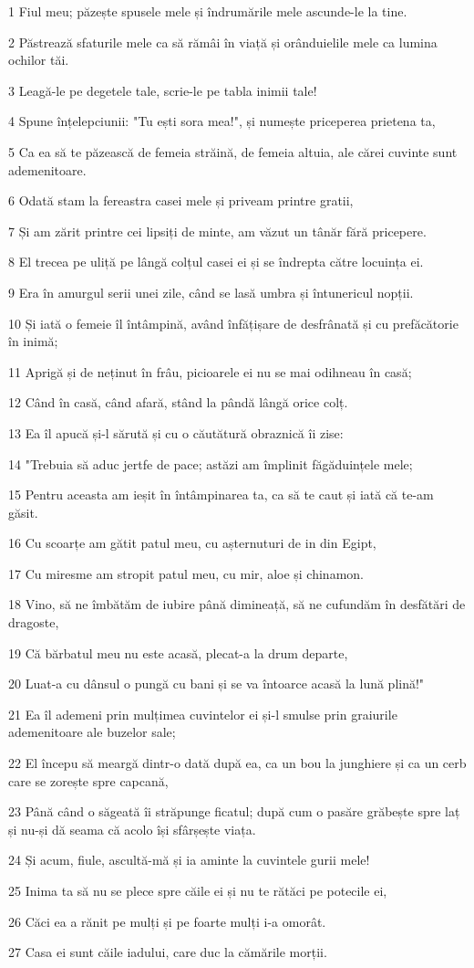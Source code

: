 \par 1 Fiul meu; păzește spusele mele și îndrumările mele ascunde-le la tine.
\par 2 Păstrează sfaturile mele ca să rămâi în viață și orânduielile mele ca lumina ochilor tăi.
\par 3 Leagă-le pe degetele tale, scrie-le pe tabla inimii tale!
\par 4 Spune înțelepciunii: "Tu ești sora mea!", și numește priceperea prietena ta,
\par 5 Ca ea să te păzească de femeia străină, de femeia altuia, ale cărei cuvinte sunt ademenitoare.
\par 6 Odată stam la fereastra casei mele și priveam printre gratii,
\par 7 Și am zărit printre cei lipsiți de minte, am văzut un tânăr fără pricepere.
\par 8 El trecea pe uliță pe lângă colțul casei ei și se îndrepta către locuința ei.
\par 9 Era în amurgul serii unei zile, când se lasă umbra și întunericul nopții.
\par 10 Și iată o femeie îl întâmpină, având înfățișare de desfrânată și cu prefăcătorie în inimă;
\par 11 Aprigă și de neținut în frâu, picioarele ei nu se mai odihneau în casă;
\par 12 Când în casă, când afară, stând la pândă lângă orice colț.
\par 13 Ea îl apucă și-l sărută și cu o căutătură obraznică îi zise:
\par 14 "Trebuia să aduc jertfe de pace; astăzi am împlinit făgăduințele mele;
\par 15 Pentru aceasta am ieșit în întâmpinarea ta, ca să te caut și iată că te-am găsit.
\par 16 Cu scoarțe am gătit patul meu, cu așternuturi de in din Egipt,
\par 17 Cu miresme am stropit patul meu, cu mir, aloe și chinamon.
\par 18 Vino, să ne îmbătăm de iubire până dimineață, să ne cufundăm în desfătări de dragoste,
\par 19 Că bărbatul meu nu este acasă, plecat-a la drum departe,
\par 20 Luat-a cu dânsul o pungă cu bani și se va întoarce acasă la lună plină!"
\par 21 Ea îl ademeni prin mulțimea cuvintelor ei și-l smulse prin graiurile ademenitoare ale buzelor sale;
\par 22 El începu să meargă dintr-o dată după ea, ca un bou la junghiere și ca un cerb care se zorește spre capcană,
\par 23 Până când o săgeată îi străpunge ficatul; după cum o pasăre grăbește spre laț și nu-și dă seama că acolo își sfârșește viața.
\par 24 Și acum, fiule, ascultă-mă și ia aminte la cuvintele gurii mele!
\par 25 Inima ta să nu se plece spre căile ei și nu te rătăci pe potecile ei,
\par 26 Căci ea a rănit pe mulți și pe foarte mulți i-a omorât.
\par 27 Casa ei sunt căile iadului, care duc la cămările morții.

